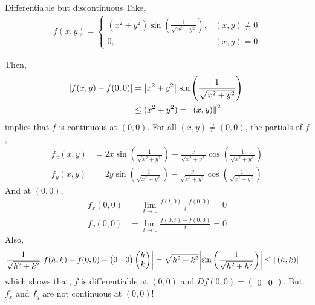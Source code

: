 \documentclass[../Analysis-3.tex]{subfiles}
\begin{document}
\begin{Eg}{Differentiable but discontinuous}{}
  Take, \begin{align*}
    f(x,y) = \begin{cases}
               \left( x^2+y^2 \right)\sin{\left( \frac{1}{\sqrt{x^2+y^2}} \right)}, & (x,y) \not= 0 \\
               0,                                                                   & (x,y) = 0
             \end{cases}
  \end{align*}
  
  Then, \begin{align*}
    \abs{f(x,y) - f(0,0)}
     & = \abs{x^2+y^2}\abs{\sin{\left( \frac{1}{\sqrt{x^2+y^2}} \right)}} \\
     & \leq (x^2+y^2) = \norm{(x,y)}^2
  \end{align*}
  implies that $ f $ is continuous at $ (0,0) $. For all $ (x,y) \not= (0,0) $, the partials of $ f $, \begin{align*}
    f_x(x,y) & = 2x\sin{\left( \frac{1}{\sqrt{x^2+y^2}} \right)} - \frac{x}{\sqrt{x^2+y^2}}\cos{\left( \frac{1}{\sqrt{x^2+y^2}} \right)} \\
    f_y(x,y) & = 2y\sin{\left( \frac{1}{\sqrt{x^2+y^2}} \right)} - \frac{y}{\sqrt{x^2+y^2}}\cos{\left( \frac{1}{\sqrt{x^2+y^2}} \right)}
  \end{align*}
  And at $(0,0)$, \begin{align*}
    f_x(0,0) & = \lim_{t \to 0} \frac{f(t,0) - f(0,0)}{t} = 0  \\
    f_y(0,0) & = \lim_{t \to 0} \frac{f(0,t) - f(0,0)}{t} = 0
  \end{align*}
  Also, \begin{align*}
    \frac{1}{\sqrt{h^2+k^2}}\abs{f(h,k) - f(0,0) - \begin{pmatrix} 0 & 0 \end{pmatrix}\begin{pmatrix} h \\ k \end{pmatrix}} & = \sqrt{h^2+k^2}\abs{\sin{\left( \frac{1}{\sqrt{h^2+h^2}} \right)}} \leq \norm{(h,k)}
  \end{align*}
  which shows that, $ f $ is differentiable at $ (0,0) $ and $ Df(0,0) = \begin{pmatrix} 0 & 0 \end{pmatrix} $. But, $ f_x $ and $ f_y $ are not continuous at $ (0,0) $!
\end{Eg}
\end{document}
